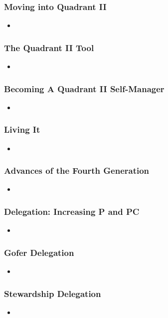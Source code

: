 \documentclass[11pt]{article}
\begin{document}
\subsubsection{Moving into Quadrant II}
\begin{itemize}
\item 
\end{itemize}
\subsubsection{The Quadrant II Tool}
\begin{itemize}
\item 
\end{itemize}
\subsubsection{Becoming A Quadrant II Self-Manager}
\begin{itemize}
\item 
\end{itemize}
\subsubsection{Living It}
\begin{itemize}
\item 
\end{itemize}
\subsubsection{Advances of the Fourth Generation}
\begin{itemize}
\item 
\end{itemize}
\subsubsection{Delegation: Increasing P and PC}
\begin{itemize}
\item 
\end{itemize}
\subsubsection{Gofer Delegation}
\begin{itemize}
\item 
\end{itemize}
\subsubsection{Stewardship Delegation}
\begin{itemize}
\item 
\end{itemize}
\end{document}
